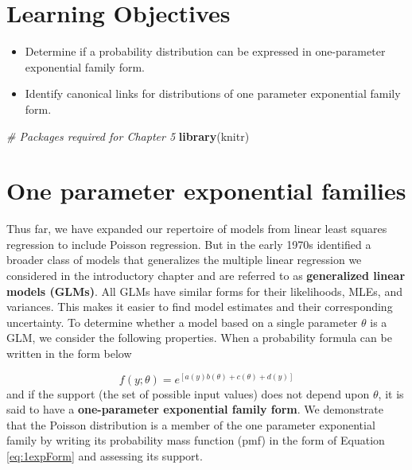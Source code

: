 \documentclass[
]{krantz}
\newenvironment{Shaded}{\begin{snugshade}}{\end{snugshade}}
\newcommand{\CommentTok}[1]{\textcolor[rgb]{0.37,0.37,0.37}{\textit{#1}}}
\newcommand{\KeywordTok}[1]{\textcolor[rgb]{0.27,0.27,0.27}{\textbf{#1}}}
\newcommand{\NormalTok}[1]{#1}
\providecommand{\tightlist}{%
  \setlength{\itemsep}{0pt}\setlength{\parskip}{0pt}}
\begin{document}
\hypertarget{learning-objectives-4}{%
\section{Learning Objectives}\label{learning-objectives-4}}

\begin{itemize}
\tightlist
\item
  Determine if a probability distribution can be expressed in one-parameter exponential family form.
\item
  Identify canonical links for distributions of one parameter exponential family form.
\end{itemize}

\begin{Shaded}
\begin{Highlighting}[]
\CommentTok{# Packages required for Chapter 5}
\KeywordTok{library}\NormalTok{(knitr)}
\end{Highlighting}
\end{Shaded}

\hypertarget{one-parameter-exponential-families}{%
\section{One parameter exponential families}\label{one-parameter-exponential-families}}

Thus far, we have expanded our repertoire of models from linear least squares regression to include Poisson regression. But in the early 1970s \citet{Nelder1972} identified a broader class of models that generalizes the multiple linear regression we considered in the introductory chapter and are referred to as \textbf{generalized linear models (GLMs)}.  All GLMs have similar forms for their likelihoods, MLEs, and variances. This makes it easier to find model estimates and their corresponding uncertainty. To determine whether a model based on a single parameter \(\theta\) is a GLM, we consider the following properties.
When a probability formula can be written in the form below

\begin{equation}
f(y;\theta)=e^{[a(y)b(\theta)+c(\theta)+d(y)]}
\label{eq:1expForm}
\end{equation}
and if the support (the set of possible input values) does not depend upon \(\theta\), it is said to have a \textbf{one-parameter exponential family form}.  We demonstrate that the Poisson distribution is a member of the one parameter exponential family by writing its probability mass function (pmf) in the form of Equation \eqref{eq:1expForm} and assessing its support.
\end{document}
